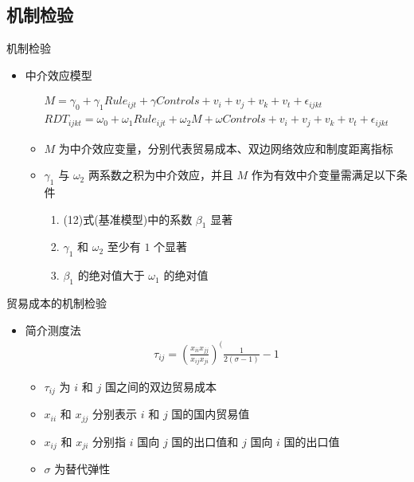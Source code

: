\documentclass{beamer}
\begin{document}
\subsection{机制检验}
\begin{frame}{机制检验}
    \begin{itemize}
        \item 中介效应模型
        \begin{tiny}
        \begin{gather*}
            M=\gamma_0+\gamma_1 Rule_{ijt}+\gamma Controls+v_i+v_j+v_k+v_t+\epsilon_{ijkt} \tag{14} \\
            RDT_{ijkt}=\omega_0+\omega_1 Rule_{ijt}+\omega_2 M+\omega Controls+v_i+v_j+v_k+v_t+\epsilon_{ijkt} \tag{15}
        \end{gather*}
        \end{tiny}
        \begin{itemize}
            \item $M$ 为中介效应变量，分别代表贸易成本、双边网络效应和制度距离指标
            \item $\gamma_1$ 与 $\omega_2$ 两系数之积为中介效应，并且 $M$ 作为有效中介变量需满足以下条件
            \begin{enumerate}
                \item (12)式(基准模型)中的系数 $\beta_1$ 显著
                \item $\gamma_1$ 和 $\omega_2$ 至少有 $1$ 个显著
                \item $\beta_1$ 的绝对值大于 $\omega_1$ 的绝对值
            \end{enumerate}
        \end{itemize}
    \end{itemize}
\end{frame}

\begin{frame}{贸易成本的机制检验}
    \begin{itemize}
        \item 简介测度法
        \begin{align*}
            \tau_{ij}=(\frac{x_{ii}x_{jj}}{x_{ij}x_{ji}})^(\frac{1}{2(\sigma - 1)}-1 \tag{16}
        \end{align*}
        \begin{itemize}
            \item $\tau_{ij}$ 为 $i$ 和 $j$ 国之间的双边贸易成本
            \item $x_{ii}$ 和 $x_{jj}$ 分别表示 $i$ 和 $j$ 国的国内贸易值
            \item $x_{ij}$ 和 $x_{ji}$ 分别指 $i$ 国向 $j$ 国的出口值和 $j$ 国向 $i$ 国的出口值
            \item $\sigma$ 为替代弹性
        \end{itemize}
    \end{itemize}
\end{frame}
\end{document}
